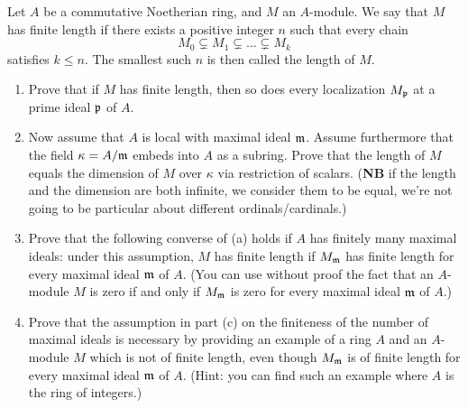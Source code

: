 \newcommand{\len}{\operatorname{len}}
\begin{question}[subtitle = January 2025 Problem 5,ID=Jan25_5]
Let $A$ be a commutative Noetherian ring, and $M$ an $A$-module. We say that $M$ has finite length if there exists a positive integer $n$ such that every chain
\[M_0 \subsetneq M_1 \subsetneq \dots \subsetneq M_k\]
satisfies $k \leq n$. The smallest such $n$ is then called the length of $M$.
\begin{enumerate}
    \item Prove that if $M$ has finite length, then so does every localization $M_{\mathfrak{p}}$ at a prime ideal $\mathfrak{p}$ of $A$.
    \item Now assume that $A$ is local with maximal ideal $\mathfrak{m}$. Assume furthermore that the field $\kappa = A/\mathfrak{m}$ embeds into $A$ as a subring. Prove that the length of $M$ equals the dimension of $M$ over $\kappa$ via restriction of scalars. (\textbf{NB} if the length and the dimension are both infinite, we consider them to be equal, we're not going to be particular about different ordinals/cardinals.)
    \item Prove that the following converse of (a) holds if $A$ has finitely many maximal ideals: under this assumption, $M$ has finite length if $M_{\mathfrak{m}}$ has finite length for every maximal ideal $\mathfrak{m}$ of $A$. (You can use without proof the fact that an $A$-module $M$ is zero if and only if $M_{\mathfrak{m}}$ is zero for every maximal ideal $\mathfrak{m}$ of $A$.)
    \item Prove that the assumption in part (c) on the finiteness of the number of maximal ideals is necessary by providing an example of a ring $A$ and an $A$-module $M$ which is not of finite length, even though $M_\mathfrak{m}$ is of finite length for every maximal ideal $\mathfrak{m}$ of $A$. (Hint: you can find such an example where $A$ is the ring of integers.)
\end{enumerate}
\end{question}
